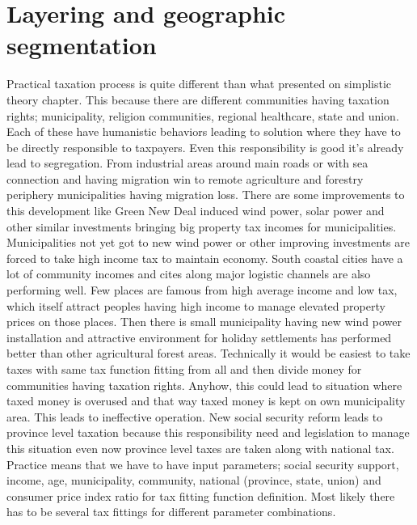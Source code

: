\section{Layering and geographic segmentation}
\label{tax_layering}
Practical taxation process is quite different than what presented on
simplistic theory chapter. This because there are different communities having
taxation rights; municipality, religion communities, regional healthcare,
state and union. Each of these have humanistic behaviors leading to solution
where they have to be directly responsible to taxpayers. Even this
responsibility is good it's already lead to segregation. From industrial areas
around main roads or with sea connection and having migration win to remote
agriculture and forestry periphery municipalities having migration loss. There
are some improvements to this development like Green New Deal induced wind
power, solar power and other similar investments bringing big property tax
incomes for municipalities. Municipalities not yet got to new wind power or
other improving investments are forced to take high income tax to maintain
economy.  South coastal cities have a lot of community incomes and cites along
major logistic channels are also performing well. Few places are famous from
high average income and low tax, which itself attract peoples having high
income to manage elevated property prices on those places. Then there is small
municipality having new wind power installation and attractive environment for
holiday settlements has performed better than other agricultural forest areas.
Technically it would be easiest to take taxes with same tax function fitting
from all and then divide money for communities having taxation rights. Anyhow,
this could lead to situation where taxed money is overused and that way taxed
money is kept on own municipality area. This leads to ineffective operation.
New social security reform leads to province level taxation because this
responsibility need and legislation to manage this situation even now province
level taxes are taken along with national tax. Practice means that we have to
have input parameters; social security support, income, age, municipality,
community, national (pro\-vin\-ce, state, union) and consumer price index
ratio for tax fitting function definition. Most likely there has to be several
tax fittings for different parameter combinations.

